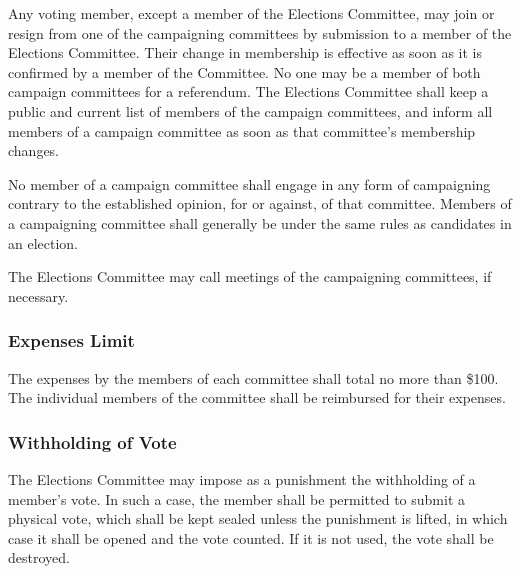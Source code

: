 Any voting member, except a member of the Elections Committee, may join or resign from one of the campaigning committees by submission to a member of the Elections Committee.
Their change in membership is effective as soon as it is confirmed by a member of the Committee.
No one may be a member of both campaign committees for a referendum.
The Elections Committee shall keep a public and current list of members of the campaign committees, and inform all members of a campaign committee as soon as that committee's membership changes.

No member of a campaign committee shall engage in any form of campaigning contrary to the established opinion, for or against, of that committee.
Members of a campaigning committee shall generally be under the same rules as candidates in an election.

The Elections Committee may call meetings of the campaigning committees, if necessary.

\subsubsection{Expenses Limit}
The expenses by the members of each committee shall total no more than \$100.
The individual members of the committee shall be reimbursed for their expenses.

\subsubsection{Withholding of Vote}
The Elections Committee may impose as a punishment the withholding of a member's vote.
In such a case, the member shall be permitted to submit a physical vote, which shall be kept sealed unless the punishment is lifted, in which case it shall be opened and the vote counted.
If it is not used, the vote shall be destroyed.
